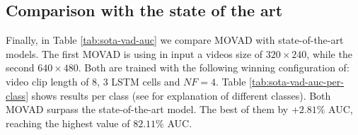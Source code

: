 \subsection{Comparison with the state of the art}
Finally, in Table \ref{tab:sota-vad-auc} we compare MOVAD with state-of-the-art models.
The first MOVAD is using in input a videos size of $320\times240$, while the second $640\times480$.
Both are trained with the following winning configuration of: video clip length of 8, 3 LSTM cells and $\mathit{NF}=4$.
Table \ref{tab:sota-vad-auc-per-class} shows results per class (see \cite{9712446} for explanation of different classes).
Both MOVAD surpass the state-of-the-art model.
The best of them by +$2.81\%$ AUC, reaching the highest value of $82.11\%$ AUC.
